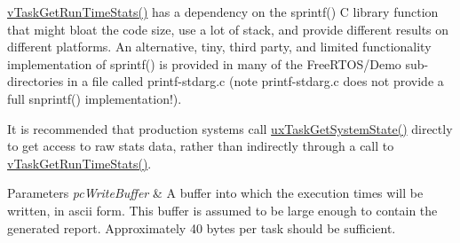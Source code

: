 \hyperlink{task_8h_ac34910d5eac69f0538ee218e527663a7}{v\+Task\+Get\+Run\+Time\+Stats()} has a dependency on the sprintf() C library function that might bloat the code size, use a lot of stack, and provide different results on different platforms. An alternative, tiny, third party, and limited functionality implementation of sprintf() is provided in many of the Free\+R\+T\+O\+S/\+Demo sub-\/directories in a file called printf-\/stdarg.\+c (note printf-\/stdarg.\+c does not provide a full snprintf() implementation!).

It is recommended that production systems call \hyperlink{task_8h_ade68760111c37287a3b82c41dff8ec7d}{ux\+Task\+Get\+System\+State()} directly to get access to raw stats data, rather than indirectly through a call to \hyperlink{task_8h_ac34910d5eac69f0538ee218e527663a7}{v\+Task\+Get\+Run\+Time\+Stats()}.


\begin{DoxyParams}{Parameters}
{\em pc\+Write\+Buffer} & A buffer into which the execution times will be written, in ascii form. This buffer is assumed to be large enough to contain the generated report. Approximately 40 bytes per task should be sufficient. \\
\hline
\end{DoxyParams}
